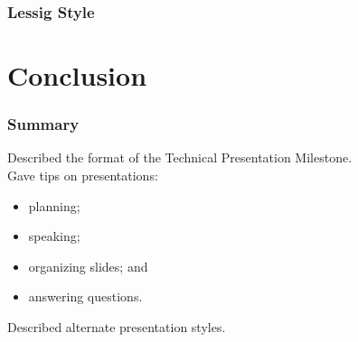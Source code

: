 \documentclass{beamer}
\begin{document}
\begin{frame}
\frametitle{Lessig Style}
\end{frame}

\section{Conclusion}

\begin{frame}
\frametitle{Summary}

Described the format of the Technical Presentation Milestone.\\[1em]

Gave tips on presentations:

\begin{itemize}
\item planning;
\item speaking;
\item organizing slides; and
\item answering questions.
\end{itemize}

Described alternate presentation styles.

\end{frame}
\end{document}
